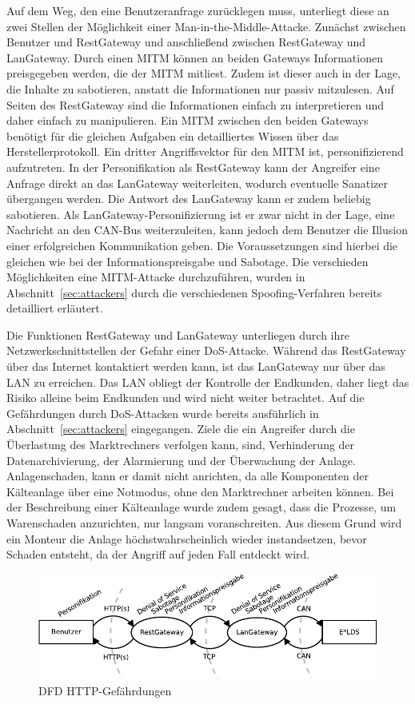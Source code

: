 \documentclass[11pt,a4paper]{report}
\begin{document}
Auf dem Weg, den eine Benutzeranfrage zurücklegen muss, unterliegt diese an zwei Stellen der Möglichkeit einer Man-in-the-Middle-Attacke. Zunächst zwischen Benutzer und RestGateway und anschließend zwischen RestGateway und LanGateway. Durch einen MITM können an beiden Gateways Informationen preisgegeben werden, die der MITM mitliest. Zudem ist dieser auch in der Lage, die Inhalte zu sabotieren, anstatt die Informationen nur passiv mitzulesen. Auf Seiten des RestGateway sind die Informationen einfach zu interpretieren und daher einfach zu manipulieren. Ein MITM zwischen den beiden Gateways benötigt für die gleichen Aufgaben ein detailliertes Wissen über das Herstellerprotokoll. Ein dritter Angriffsvektor für den MITM ist, personifizierend aufzutreten. In der Personifikation als RestGateway kann der Angreifer eine Anfrage direkt an das LanGateway weiterleiten, wodurch eventuelle Sanatizer übergangen werden. Die Antwort des LanGateway kann er zudem beliebig sabotieren. Als LanGateway-Personifizierung ist er zwar nicht in der Lage, eine Nachricht an den CAN-Bus weiterzuleiten, kann jedoch dem Benutzer die Illusion einer erfolgreichen Kommunikation geben. Die Voraussetzungen sind hierbei die gleichen wie bei der Informationspreisgabe und Sabotage. Die verschieden Möglichkeiten eine MITM-Attacke durchzuführen, wurden in Abschnitt~\ref{sec:attackers} durch die verschiedenen Spoofing-Verfahren bereits detailliert erläutert.

Die Funktionen RestGateway und LanGateway unterliegen durch ihre Netzwerkschnittstellen der Gefahr einer DoS-Attacke. Während das RestGateway über das Internet kontaktiert werden kann, ist das LanGateway nur über das LAN zu erreichen. Das LAN obliegt der Kontrolle der Endkunden, daher liegt das Risiko alleine beim Endkunden und wird nicht weiter betrachtet. Auf die Gefährdungen durch DoS-Attacken wurde bereits ausführlich in Abschnitt~\ref{sec:attackers} eingegangen. Ziele die ein Angreifer durch die Überlastung des Marktrechners verfolgen kann, sind, Verhinderung der Datenarchivierung, der Alarmierung und der Überwachung der Anlage. Anlagenschaden, kann er damit nicht anrichten, da alle Komponenten der Kälteanlage über eine Notmodus, ohne den Marktrechner arbeiten können. Bei der Beschreibung einer Kälteanlage wurde zudem gesagt, dass die Prozesse, um Warenschaden anzurichten, nur langsam voranschreiten. Aus diesem Grund wird ein Monteur die Anlage höchstwahrscheinlich wieder instandsetzen, bevor Schaden entsteht, da der Angriff auf jeden Fall entdeckt wird.

\begin{figure}[htbp]
\centering
\includegraphics[scale=1]{images/dfd_http_threat.pdf}
\caption{DFD HTTP-Gefährdungen}
\label{fig:dfd_http_threat}
\end{figure}
\end{document}
